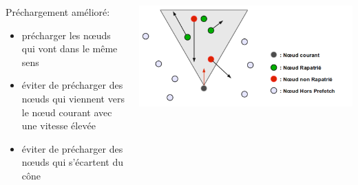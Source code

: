 \documentclass{beamer}
\begin{document}
  \begin{frame}
	\begin{columns}
         \begin{column}{5cm}
	 Préchargement amélioré:
          \begin{itemize}
		\item précharger les nœuds qui vont dans le même sens
		\item éviter de précharger des nœuds qui viennent vers le nœud courant avec une vitesse élevée
		\item éviter de précharger des nœuds qui s'écartent du cône
	  \end{itemize}
	 \end{column}
         \begin{column}{6cm}
          \includegraphics[scale=0.11]{./Ressources/Images/prefetchaV1.png}\\
         \end{column}
        \end{columns}

  \end{frame}
	
\end{document}
